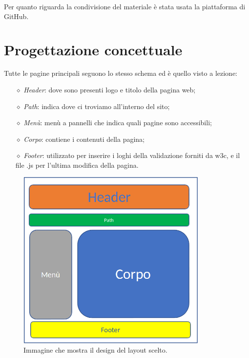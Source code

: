 \documentclass[12pt, a4paper]{article}
\renewcommand{\labelitemiii}{$\diamond$}
\begin{document}
Per quanto riguarda la condivisione del materiale è stata usata la piattaforma di GitHub.



 
\pagebreak %

\section{Progettazione concettuale}
Tutte le pagine principali seguono lo stesso schema ed è quello visto a lezione:
\begin{itemize}
	\item[\labelitemiii] \textit{Header}: dove sono presenti logo e titolo della pagina web;
	\item[\labelitemiii] \textit{Path}: indica dove ci troviamo all'interno del sito;
	\item[\labelitemiii] \textit{Menù}: menù a pannelli che indica quali pagine sono accessibili;
	\item[\labelitemiii] \textit{Corpo}: contiene i contenuti della pagina;
	\item[\labelitemiii] \textit{Footer}: utilizzato per inserire i loghi della validazione forniti da w3c, e il file .js per l’ultima modifica della pagina.
\end{itemize}

\begin{figure}[htb]
	\centering
	\includegraphics[height=9cm]{img/prog.png}
	\caption{Immagine che mostra il design del layout scelto.}	
\end{figure}
\end{document}
